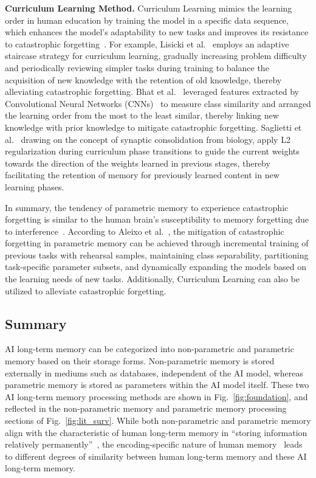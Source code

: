 \documentclass[journal,hideappendix]{vgtc}
\newenvironment{j_itemize}{
\begin{itemize}[]
  \setlength{\itemsep}{3pt}
  \setlength{\parskip}{0pt}
  \setlength{\parsep}{0pt}
}{\end{itemize}}
\begin{document}
\begin{j_itemize}
    \item[$\bullet$] \textbf{Curriculum Learning Method.} Curriculum Learning mimics the learning order in human education by training the model in a specific data sequence, which enhances the model's adaptability to new tasks and improves its resistance to catastrophic forgetting~\cite{parisi2019continual,wang2021survey}. For example, Lisicki et al.~\cite{lisicki2020evaluating} employs an adaptive staircase strategy for curriculum learning, gradually increasing problem difficulty and periodically reviewing simpler tasks during training to balance the acquisition of new knowledge with the retention of old knowledge, thereby alleviating catastrophic forgetting. Bhat et al.~\cite{bhat2021cilea} leveraged features extracted by Convolutional Neural Networks (CNNs)~\cite{li2021survey} to measure class similarity and arranged the learning order from the most to the least similar, thereby linking new knowledge with prior knowledge to mitigate catastrophic forgetting. Saglietti et al.~\cite{saglietti2022analytical} drawing on the concept of synaptic consolidation from biology, apply L2 regularization during curriculum phase transitions to guide the current weights towards the direction of the weights learned in previous stages, thereby facilitating the retention of memory for previously learned content in new learning phases.

\end{j_itemize}

In summary, the tendency of parametric memory to experience catastrophic forgetting is similar to the human brain's susceptibility to memory forgetting due to interference~\cite{underwood1957interference}. According to Aleixo et al.~\cite{aleixo2023catastrophic}, the mitigation of catastrophic forgetting in parametric memory can be achieved through incremental training of previous tasks with rehearsal samples, maintaining class separability, partitioning task-specific parameter subsets, and dynamically expanding the models based on the learning needs of new tasks. Additionally, Curriculum Learning can also be utilized to alleviate catastrophic forgetting.

\subsection{Summary}

AI long-term memory can be categorized into non-parametric and parametric memory based on their storage forms. Non-parametric memory is stored externally in mediums such as databases, independent of the AI model, whereas parametric memory is stored as parameters within the AI model itself. These two AI long-term memory processing methods are shown in Fig.~\ref{fig:foundation}, and reflected in the non-parametric memory and parametric memory processing sections of Fig.~\ref{fig:lit_surv}. While both non-parametric and parametric memory align with the characteristic of human long-term memory in ``storing information relatively permanently''~\cite{atkinson1968human}, the encoding-specific nature of human memory~\cite{tulving1973encoding} leads to different degrees of similarity between human long-term memory and these AI long-term memory. 
\end{document}
